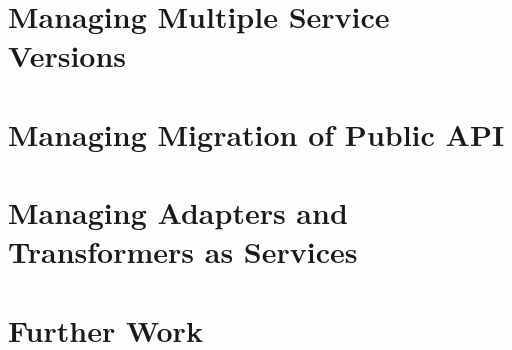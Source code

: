 \section{Managing Multiple Service Versions}
\label{sec:esbd-multi-version-service}


\section{Managing Migration of Public API}
\label{sec:esbd-multi-stage-env}

\section{Managing Adapters and Transformers as Services}
\label{sec:esbd-adap-trans-service}


\section{Further Work}
\label{sec:esbd-furhter-work}